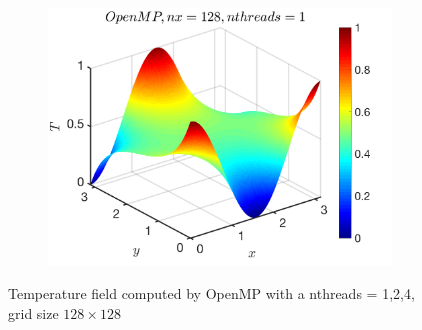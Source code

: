\documentclass[a4paper]{article}
\begin{document}
\begin{figure}[H]
\begin{subfigure}[b]{0.32\textwidth}
            \includegraphics[width=\textwidth]{./Figure/heat_omp_nx128_nth8.png} 
        \end{subfigure}
        \caption{Temperature field computed by OpenMP with a nthreads = 1,2,4, grid size $128\times128$}
    \end{figure}
    
\end{document}
